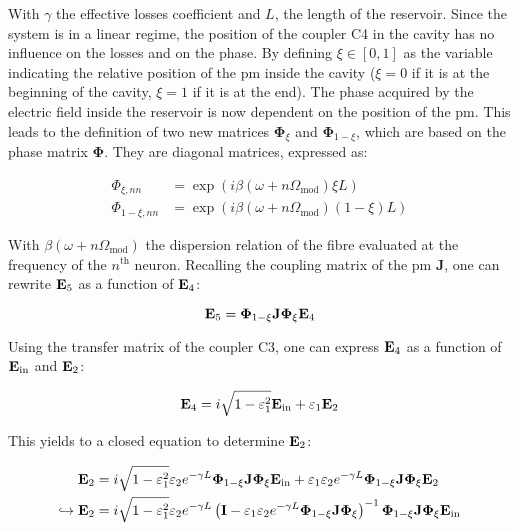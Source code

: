 With $\gamma$ the effective losses coefficient and $L$, the length of the reservoir. Since the system is in a linear regime, the position of the coupler C4 in the cavity has no influence on the losses and on the phase. By defining $\xi \in [0,1]$ as the variable indicating the relative position of the \gls{pm} inside the cavity ($\xi = 0$ if it is at the beginning of the cavity, $\xi=1$ if it is at the end). The phase acquired  by the electric field inside the reservoir is now dependent on the position of the \gls{pm}. This leads to the definition of two new matrices $\mathbf{\Phi}_\xi$ and $\mathbf{\Phi}_{1-\xi}$, which are based on the phase matrix $\mathbf{\Phi}$. They are diagonal matrices, expressed as:

\begin{align}
	\Phi_{\xi,nn} &= \exp{ \left(i \beta (\omega+n\Omega_{\text{mod}}) \xi L \right)} \nonumber \\
	\Phi_{1-\xi,nn} &= \exp{ \left(i \beta (\omega+n\Omega_{\text{mod}}) (1-\xi) L \right)}
\end{align}

With $\beta (\omega+n\Omega_{\text{mod}})$ the dispersion relation of the fibre evaluated at the frequency of the $n^{\text{th}}$ neuron. Recalling the coupling matrix of the \gls{pm} $\mathbf{J}$, one can rewrite $\mathbf{E}_{\text{5}}$ as a function of $\mathbf{E}_{\text{4}}$:

\begin{equation}
	\mathbf{E}_{\text{5}} = \mathbf{\Phi}_{1-\xi} \mathbf{J} \mathbf{\Phi}_\xi \mathbf{E}_{\text{4}}
\end{equation}

Using the transfer matrix of the coupler C3, one can express $\mathbf{E}_{\text{4}}$ as a function of $\mathbf{E}_{\text{in}}$ and $\mathbf{E}_{\text{2}}$:

\begin{equation}
	\mathbf{E}_{\text{4}} = i\sqrt{1-\varepsilon_1^2} \mathbf{E}_{\text{in}} + \varepsilon_1 \mathbf{E}_{\text{2}}
\end{equation}

This yields to a closed equation to determine $\mathbf{E}_{\text{2}}$:

\begin{align}
	\mathbf{E}_{\text{2}} &= i\sqrt{1-\varepsilon_1^2} \varepsilon_2 e^{-\gamma L} \mathbf{\Phi}_{1-\xi} \mathbf{J} \mathbf{\Phi}_\xi \mathbf{E}_{\text{in}} + \varepsilon_1 \varepsilon_2 e^{-\gamma L} \mathbf{\Phi}_{1-\xi} \mathbf{J} \mathbf{\Phi}_\xi \mathbf{E}_{\text{2}} \nonumber \\
	\hookrightarrow \mathbf{E}_{\text{2}} &= i \sqrt{1-\varepsilon_1^2} \varepsilon_2 e^{-\gamma L} \left( \mathbf{I} - \varepsilon_1 \varepsilon_2 e^{- \gamma L} \mathbf{\Phi}_{1-\xi} \mathbf{J} \mathbf{\Phi}_\xi \right)^{-1} \mathbf{\Phi}_{1-\xi} \mathbf{J} \mathbf{\Phi}_\xi \mathbf{E}_{\text{in}}
\end{align}

